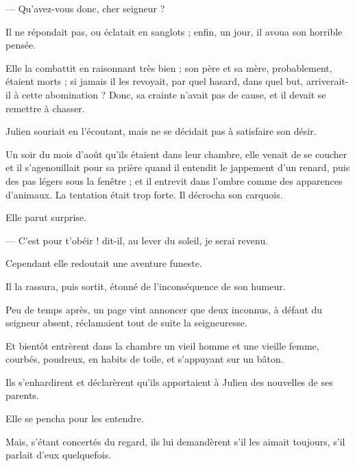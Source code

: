 \documentclass[]{book}
\begin{document}
                — Qu'avez-vous donc, cher seigneur ?
                    
                Il ne répondait pas, ou éclatait en sanglots ; enfin, un jour, il avoua son horrible pensée.
                    
                Elle la combattit en raisonnant très bien ; son père et sa mère, probablement, étaient morts ; si jamais il les revoyait, par quel hasard, dans quel but, arriverait-il à cette abomination ? Donc, sa crainte n'avait pas de cause, et il devait se remettre à chasser.
                    
                Julien souriait en l'écoutant, mais ne se décidait pas à satisfaire son désir.
                    
                Un soir du mois d'août qu'ils étaient dans leur chambre, elle venait de se coucher et il s'agenouillait pour sa prière quand il entendit le jappement d'un renard, puis des pas légers sous la fenêtre ; et il entrevit dans l'ombre comme des apparences d'animaux. La tentation était trop forte. Il décrocha son carquois.
                    
                Elle parut surprise.
                    
                — C'est pour t'obéir ! dit-il, au lever du soleil, je serai revenu.
                    
                Cependant elle redoutait une aventure funeste.
                    
                Il la rassura, puis sortit, étonné de l'inconséquence de son humeur.
                    
                Peu de temps après, un page vint annoncer que deux inconnus, à défaut du seigneur absent, réclamaient tout de suite la seigneuresse.
                    
                Et bientôt entrèrent dans la chambre un vieil homme et une vieille femme, courbés, poudreux, en habits de toile, et s'appuyant sur un bâton.
                    
                Ils s'enhardirent et déclarèrent qu'ils apportaient à Julien des nouvelles de ses parents.
                    
                Elle se pencha pour les entendre.
                    
                Mais, s'étant concertés du regard, ils lui demandèrent s'il les aimait toujours, s'il parlait d'eux quelquefois.
                    
\end{document}
